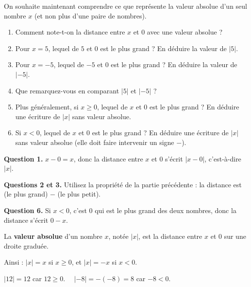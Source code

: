 \documentclass[10pt,a4paper]{article}
\begin{document}
\begin{exo}[][]
    On souhaite maintenant comprendre ce que représente la valeur absolue d'un seul nombre \(x\) (et non plus d'une paire de nombres).
    \begin{enumerate}
        \item Comment note-t-on la distance entre \(x\) et \(0\) avec une valeur absolue ?
        \item Pour \(x=5\), lequel de \(5\) et \(0\) est le plus grand ? En déduire la valeur de \(|5|\).
        \item Pour \(x=-5\), lequel de \(-5\) et \(0\) est le plus grand ? En déduire la valeur de \(|-5|\).
        \item Que remarquez-vous en comparant \(|5|\) et \(|-5|\) ?
        \item Plus généralement, si \(x\geq 0\), lequel de \(x\) et \(0\) est le plus grand ? En déduire une écriture de \(|x|\) sans valeur absolue.
        \item Si \(x<0\), lequel de \(x\) et \(0\) est le plus grand ? En déduire une écriture de \(|x|\) sans valeur absolue (elle doit faire intervenir un signe \(-\)).
    \end{enumerate}

    \begin{indication}
        \textbf{Question 1.} \(x-0=x\), donc la distance entre \(x\) et \(0\) s'écrit \(|x-0|\), c'est-à-dire \(|x|\).

        \textbf{Questions 2 et 3.} Utilisez la propriété de la partie précédente : la distance est (le plus grand) \(-\) (le plus petit).

        \textbf{Question 6.} Si \(x<0\), c'est \(0\) qui est le plus grand des deux nombres, donc la distance s'écrit \(0-x\).
    \end{indication}
\end{exo}

\begin{defi}
    La \textbf{valeur absolue} d'un nombre \(x\), notée \(|x|\), est la distance entre \(x\) et \(0\) sur une droite graduée.

    Ainsi : \(|x| = x\) si \(x\geq 0\), et \(|x| = -x\) si \(x<0\).
\end{defi}

\begin{exple}
    \(|12| = 12\) car \(12\geq 0\). \(\quad |-8| = -(-8) = 8\) car \(-8<0\).
\end{exple}
\end{document}
